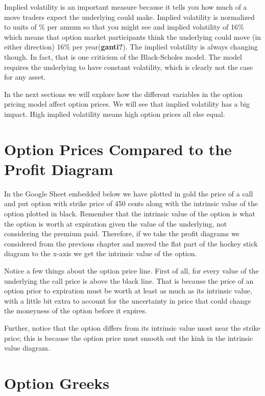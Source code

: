 \documentclass[
  letterpaper,
  DIV=11,
  numbers=noendperiod]{scrreprt}
\begin{document}
Implied volatility is an important measure because it tells you how much
of a move traders expect the underlying could make. Implied volatility
is normalized to units of \% per annum so that you might see and implied
volatility of 16\% which means that option market participants think the
underlying could move (in either direction) 16\% per
year(\textbf{ganti?}). The implied volatility is always changing though.
In fact, that is one criticism of the Black-Scholes model. The model
requires the underlying to have constant volatility, which is clearly
not the case for any asset.

In the next sections we will explore how the different variables in the
option pricing model affect option prices. We will see that implied
volatility has a big impact. High implied volatility means high option
prices all else equal.

\hypertarget{option-prices-compared-to-the-profit-diagram}{%
\section{Option Prices Compared to the Profit
Diagram}\label{option-prices-compared-to-the-profit-diagram}}

In the Google Sheet embedded below we have plotted in gold the price of
a call and put option with strike price of 450 cents along with the
intrinsic value of the option plotted in black. Remember that the
intrinsic value of the option is what the option is worth at expiration
given the value of the underlying, not considering the premium paid.
Therefore, if we take the profit diagrams we considered from the
previous chapter and moved the flat part of the hockey stick diagram to
the x-axis we get the intrinsic value of the option.

Notice a few things about the option price line. First of all, for every
value of the underlying the call price is above the black line. That is
because the price of an option prior to expiration must be worth at
least as much as its intrinsic value, with a little bit extra to account
for the uncertainty in price that could change the moneyness of the
option before it expires.

Further, notice that the option differs from its intrinsic value most
near the strike price; this is because the option price must smooth out
the kink in the intrinsic value diagram.

\hypertarget{option-greeks}{%
\section{Option Greeks}\label{option-greeks}}
\end{document}
